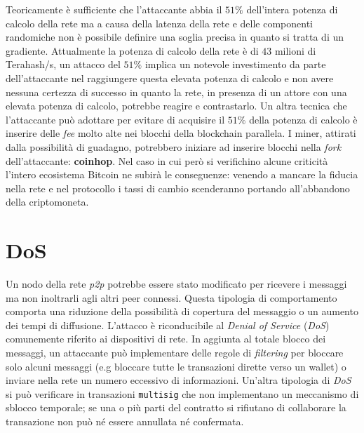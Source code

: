 Teoricamente è sufficiente che l'attaccante abbia il $51\%$ dell'intera potenza di calcolo della rete ma a causa della latenza della rete e delle componenti randomiche non è possibile definire una soglia precisa in quanto si tratta di un gradiente.\newline
Attualmente la potenza di calcolo della rete è di $43$ milioni di Terahash/s, un attacco del $51\%$ implica un notevole investimento da parte dell'attaccante nel raggiungere questa elevata potenza di calcolo e non avere nessuna certezza di successo in quanto la rete, in presenza di un attore con una elevata potenza di calcolo, potrebbe reagire e contrastarlo. Un altra tecnica che l'attaccante può adottare per evitare di acquisire il $51\%$ della potenza di calcolo è inserire delle \textit{fee} molto alte nei blocchi della blockchain parallela. I miner, attirati dalla possibilità di guadagno, potrebbero iniziare ad inserire blocchi nella \textit{fork} dell'attaccante: \textbf{coinhop}.\newline
Nel caso in cui però si verifichino alcune criticità l'intero ecosistema Bitcoin ne subirà le conseguenze: venendo a mancare la fiducia nella rete e nel protocollo i tassi di cambio scenderanno portando all'abbandono della criptomoneta.\newline

\section{DoS}
Un nodo della rete \textit{p2p} potrebbe essere stato modificato per ricevere i messaggi ma non inoltrarli agli altri peer connessi. Questa tipologia di comportamento comporta una riduzione della possibilità di copertura del messaggio o un aumento dei tempi di diffusione. L'attacco è riconducibile al \textit{Denial of Service} (\textit{DoS}) comunemente riferito ai dispositivi di rete.\newline
In aggiunta al totale blocco dei messaggi, un attaccante può implementare delle regole di \textit{filtering} per bloccare solo alcuni messaggi (e.g bloccare tutte le transazioni dirette verso un wallet) o inviare nella rete un numero eccessivo di informazioni.\newline
Un'altra tipologia di \textit{DoS} si può verificare in transazioni \texttt{multisig} che non implementano un meccanismo di sblocco temporale; se una o più parti del contratto si rifiutano di collaborare la transazione non può né essere annullata né confermata.

